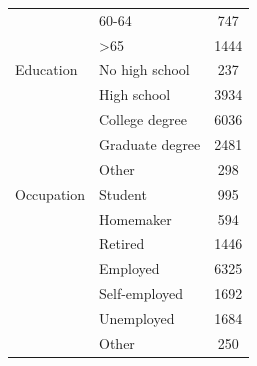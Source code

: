 \documentclass[manuscript,screen,review,anonymous]{acmart}
\theoremstyle{acmplain}
\theoremstyle{researchquestionstyle}
\begin{document}
\begin{table}[t]
\begin{minipage}[t]{0.485\linewidth}
\begin{tabular}{llc}
			& 60-64 & 747 \\
			& >65 & 1444 \\
			\midrule
			Education & No high school & 237 \\
			& High school & 3934 \\
			& College degree & 6036 \\
			& Graduate degree & 2481 \\
			& Other & 298 \\
			\midrule
			Occupation & Student & 995 \\
			& Homemaker & 594 \\
			& Retired & 1446 \\
			& Employed & 6325 \\
			& Self-employed & 1692 \\
			& Unemployed & 1684 \\
			& Other & 250 \\
			\bottomrule
		\end{tabular}
	\end{minipage}
\end{table}
\end{document}
